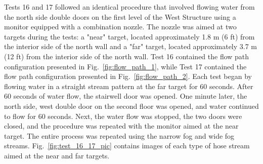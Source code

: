 \documentclass[12pt,oneside]{book}
\begin{document}
Tests 16 and 17 followed an identical procedure that involved flowing water from the north side double doors on the first level of the West Structure using a monitor equipped with a combination nozzle. The nozzle was aimed at two targets during the tests: a "near" target, located approximately 1.8 m (6 ft) from the interior side of the north wall and a "far" target, located approximately 3.7 m (12 ft) from the interior side of the north wall. Test 16 contained the flow path configuration presented in Fig.~\ref{fig:flow_path_1}, while Test 17 contained the flow path configuration presented in Fig.~\ref{fig:flow_path_2}. Each test began by flowing water in a straight stream pattern at the far target for 60 seconds. After 60 seconds of water flow, the stairwell door was opened. One minute later, the north side, west double door on the second floor was opened, and water continued to flow for 60 seconds. Next, the water flow was stopped, the two doors were closed, and the procedure was repeated with the monitor aimed at the near target. The entire process was repeated using the narrow fog and wide fog streams. Fig.~\ref{fig:test_16_17_pic} contains images of each type of hose stream aimed at the near and far targets.
\end{document}
